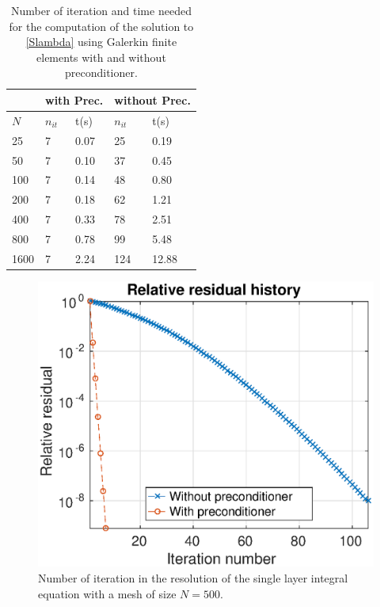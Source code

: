 \documentclass[a4paper]{article}
\begin{document}
	
	\begin{table}
		\begin{center}
			\begin{tabular}{|| m{4em} | m{4em} | m{4em} | m{4em} | m{4em}||} 
				\hline
				\multicolumn{1}{||c|}{ }&
				\multicolumn{2}{c|}{with Prec.}&\multicolumn{2}{c||}{without Prec.}\\
				\hline
				$N$ & $n_{it}$& t(s) & $n_{it}$ & t(s)\\
				\hline\hline
				25 & 7 & 0.07 & 25 & 0.19\\ 
				\hline
				50 & 7 & 0.10 & 37 & 0.45\\
				\hline
				100 & 7 & 0.14 & 48 & 0.80\\
				\hline
				200 & 7 & 0.18 & 62 & 1.21\\
				\hline
				400 & 7 & 0.33 & 78 & 2.51\\
				\hline
				800 & 7 & 0.78 & 99 & 5.48\\
				\hline
				1600 & 7 & 2.24 & 124 & 12.88\\
				\hline
			\end{tabular}
		\end{center}
		\caption{Number of iteration and time needed for the computation of the solution to \eqref{Slambda} using Galerkin finite elements with and without preconditioner.}
		\label{TableNitTimeLaplaceDirichlet}
	\end{table}
	
	
	
	
	\begin{figure}
		\centering
		\includegraphics[scale=0.7]{PrecondLaplaceDirichletIterations}
		\caption{Number of iteration in the resolution of the single layer integral equation with a mesh of size $N = 500$.}
		\label{FigureNitLaplaceDirichlet}
	\end{figure}
	
\end{document}
